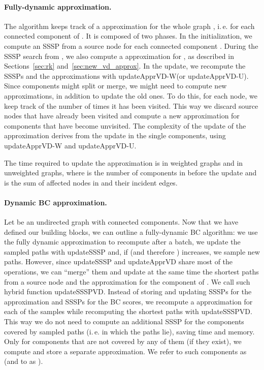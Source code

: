 \documentclass[english]{llncs}
\newcommand{\ie}{i.\,e.\xspace}
\newcommand{\vd}{\xspace}
\newcommand{\vda}{\xspace}
\newcommand{\upvd}{\textsf{updateApprVD-W}\xspace}
\newcommand{\upvdu}{\textsf{updateApprVD-U}\xspace}
\begin{document}
\paragraph{Fully-dynamic \vd approximation.}
The algorithm keeps track of a \vd approximation for the whole graph , \ie for each connected component of . It is composed of two phases. In the initialization, we compute an SSSP from a source node  for each connected component . During the SSSP search from , we also compute a \vd approximation  for , as described in Sections~\ref{sec:rk} and~\ref{sec:new_vd_approx}. In the update, we recompute the SSSPs and the \vd approximations with \upvd (or \upvdu). Since components might split or merge, we might need to compute new approximations, in addition to update the old ones. To do this, for each node, we keep track of the number of times it has been visited. This way we discard source nodes that have already been visited and compute a new approximation for components that have become unvisited. The complexity of the update of the \vd approximation derives from the \vda update in the single components, using \upvd and \upvdu.
\begin{theorem}
\label{thm:complexity_vd}
The time required to update the \vd approximation is  in weighted graphs and  in unweighted graphs, where  is the number of components in  before the update and  is the sum of affected nodes in  and their incident edges.
\end{theorem}
\paragraph{Dynamic BC approximation.}
Let  be an undirected graph with  connected components. Now that we have defined our building blocks, we can outline a fully-dynamic BC algorithm: we use the fully dynamic \vd approximation to recompute \vda after a batch, we update the  sampled paths with \textsf{updateSSSP} and, if \vda (and therefore ) increases, we sample new paths. However, since \textsf{updateSSSP} and \textsf{updateApprVD} share most of the operations, we can ``merge'' them and update at the same time the shortest paths from a source node  and the \vd approximation for the component of . We call such hybrid function \textsf{updateSSSPVD}. Instead of storing and updating  SSSPs for the \vd approximation and  SSSPs for the BC scores, we 
recompute a \vd approximation for each of the  samples while recomputing the shortest paths with \textsf{updateSSSPVD}. This way we do not need to compute an additional SSSP for the components covered by  sampled paths (\ie in which the paths lie), saving time and memory. Only for components that are not covered by any of them (if they exist), we compute and store a separate \vd approximation. We refer to such components as  (and to  as ). 
\end{document}
